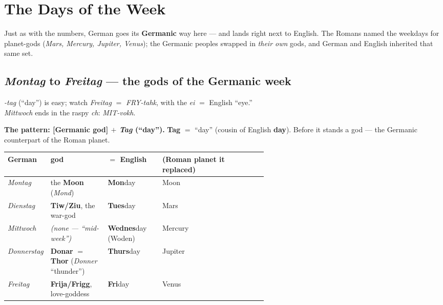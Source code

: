 \chapter{The Days of the Week}
\label{ch:days}

Just as with the numbers, German goes its \textbf{Germanic} way here --- and
lands right next to English. The Romans named the weekdays for planet-gods
(\emph{Mars, Mercury, Jupiter, Venus}); the Germanic peoples swapped in
\emph{their own} gods, and German and English inherited that same set.

\section{\emph{Montag} to \emph{Freitag} --- the gods of the Germanic week}
\label{lesson:wochentage-1}

\begin{sounds}
\emph{-tag} (``day'') is easy; watch \emph{Freitag} $=$ \emph{FRY-tahk}, with
the \emph{ei} $=$ English ``eye.''\\[3pt]
\emph{Mittwoch} ends in the raspy \emph{ch}: \emph{MIT-vokh}.
\end{sounds}

\begin{morphologybox}
\textbf{The pattern: [Germanic god] $+$ \emph{Tag} (``day'').} \textbf{Tag} $=$
``day'' (cousin of English \textbf{day}). Before it stands a god --- the
Germanic counterpart of the Roman planet.
\end{morphologybox}

\noindent
\begin{tabularx}{\linewidth}{@{}>{\raggedright\arraybackslash}p{0.16\linewidth}>{\raggedright\arraybackslash}p{0.22\linewidth}>{\raggedright\arraybackslash}p{0.21\linewidth}>{\raggedright\arraybackslash}X@{}}
\toprule
German & god & $=$ English & (Roman planet it replaced) \\
\midrule
\emph{Montag} & the \textbf{Moon} (\emph{Mond}) & \textbf{Mon}day & Moon \\
\emph{Dienstag} & \textbf{Tiw/Ziu}, the war-god & \textbf{Tues}day & Mars \\
\emph{Mittwoch} & \emph{(none --- ``mid-week'')} & \textbf{Wednes}day (Woden) & Mercury \\
\emph{Donnerstag} & \textbf{Donar} $=$ \textbf{Thor} (\emph{Donner} ``thunder'') & \textbf{Thurs}day & Jupiter \\
\emph{Freitag} & \textbf{Frija/Frigg}, love-goddess & \textbf{Fri}day & Venus \\
\bottomrule
\end{tabularx}

